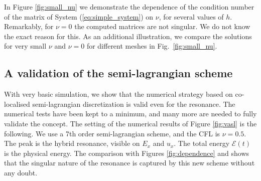 In Figure \ref{fig:small_nu} we demonstrate the dependence of the condition number of the matrix of System (\ref{eq:simple_system}) 
on $\nu$, for several values of $h$.
Remarkably, for $\nu=0$ the computed matrices are not singular. We do not know the exact reason for this.
As an additional illustration, we compare the solutions for very small $\nu$ and $\nu=0$ for different meshes in Fig.~\ref{fig:small_nu}. 



\FloatBarrier

\subsection{A validation of the semi-lagrangian scheme}
With very basic simulation, we show that the numerical strategy 
based on co-localised semi-lagrangian discretization is valid even for the resonance.
The numerical tests have been kept to a minimum, and many more are needed to fully validate
the concept.
The setting of the numerical results of Figure \ref{fig:vasl}
is the following. We use a 7th order semi-lagrangian scheme, and the CFL is $\nu=0.5$.
The peak is the hybrid resonance, visible on $E_x$ and $u_x$.
The total energy $\mathcal E(t)$ is the physical energy. 
The comparison with Figures \ref{fig:dependence} and \nrev{\ref{fig:resonance_nus_ex_t}} shows that the 
singular nature of the resonance is captured by this new scheme without any doubt.

